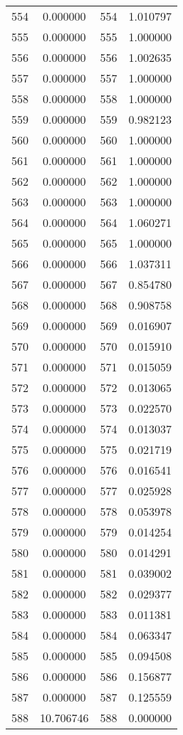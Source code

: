 \documentclass[12pt]{article}
\begin{document}
\begin{longtable}{@{}cccc@{}}
554 & 0.000000 & 554 & 1.010797 \\
555 & 0.000000 & 555 & 1.000000 \\
556 & 0.000000 & 556 & 1.002635 \\
557 & 0.000000 & 557 & 1.000000 \\
558 & 0.000000 & 558 & 1.000000 \\
559 & 0.000000 & 559 & 0.982123 \\
560 & 0.000000 & 560 & 1.000000 \\
561 & 0.000000 & 561 & 1.000000 \\
562 & 0.000000 & 562 & 1.000000 \\
563 & 0.000000 & 563 & 1.000000 \\
564 & 0.000000 & 564 & 1.060271 \\
565 & 0.000000 & 565 & 1.000000 \\
566 & 0.000000 & 566 & 1.037311 \\
567 & 0.000000 & 567 & 0.854780 \\
568 & 0.000000 & 568 & 0.908758 \\
569 & 0.000000 & 569 & 0.016907 \\
570 & 0.000000 & 570 & 0.015910 \\
571 & 0.000000 & 571 & 0.015059 \\
572 & 0.000000 & 572 & 0.013065 \\
573 & 0.000000 & 573 & 0.022570 \\
574 & 0.000000 & 574 & 0.013037 \\
575 & 0.000000 & 575 & 0.021719 \\
576 & 0.000000 & 576 & 0.016541 \\
577 & 0.000000 & 577 & 0.025928 \\
578 & 0.000000 & 578 & 0.053978 \\
579 & 0.000000 & 579 & 0.014254 \\
580 & 0.000000 & 580 & 0.014291 \\
581 & 0.000000 & 581 & 0.039002 \\
582 & 0.000000 & 582 & 0.029377 \\
583 & 0.000000 & 583 & 0.011381 \\
584 & 0.000000 & 584 & 0.063347 \\
585 & 0.000000 & 585 & 0.094508 \\
586 & 0.000000 & 586 & 0.156877 \\
587 & 0.000000 & 587 & 0.125559 \\
588 & 10.706746 & 588 & 0.000000 \\

\end{longtable}
\end{document}
